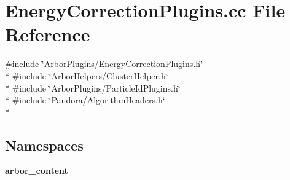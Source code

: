 \section{Energy\+Correction\+Plugins.\+cc File Reference}
\label{EnergyCorrectionPlugins_8cc}
{\ttfamily \#include \char`\"{}Arbor\+Plugins/\+Energy\+Correction\+Plugins.\+h\char`\"{}}\\*
{\ttfamily \#include \char`\"{}Arbor\+Helpers/\+Cluster\+Helper.\+h\char`\"{}}\\*
{\ttfamily \#include \char`\"{}Arbor\+Plugins/\+Particle\+Id\+Plugins.\+h\char`\"{}}\\*
{\ttfamily \#include \char`\"{}Pandora/\+Algorithm\+Headers.\+h\char`\"{}}\\*
\subsection*{Namespaces}
\begin{DoxyCompactItemize}
\item 
 {\bf arbor\+\_\+content}
\end{DoxyCompactItemize}
